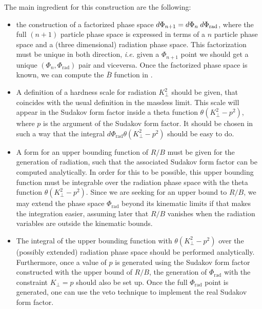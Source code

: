 \documentclass[11pt,a4paper]{article}
\newcommand{\tmop}[1]{\ensuremath{\operatorname{#1}}}
\newcommand{\tmtexttt}[1]{{\ttfamily{#1}}}
\begin{document}
The main ingredient for this construction are the following:
\begin{itemize}
  \item the construction of a factorized phase space $d \Phi_{n + 1} = d
  \Phi_n \hspace{0.25em} d \Phi_{\tmop{rad}}$, where the full $(n + 1)$
  particle phase space is expressed in terms of a $n$ particle phase space and
  a (three dimensional) radiation phase space. This factorization must be
  unique in both direction, {\it i.e.} given a $\Phi_{n + 1}$ point we should get a
  unique $(\Phi_n, \Phi_{\tmop{rad}})$ pair and viceversa. Once the factorized
  phase space is known, we can compute the $\bar{B}$ function in
  \tmtexttt{POWHEG}.
  
  \item A definition of a hardness scale for radiation $K_{\perp}^2$ should be
  given, that coincides with the usual definition in the massless limit. This
  scale will appear in the Sudakov form factor inside a theta function $\theta
  (K_{\perp}^2 - p^2)$, where $p$ is the argument of the Sudakov form factor.
  It should be chosen in such a way that the integral
  $d \Phi_{\tmop{rad}}\theta  (K_{\perp}^2 - p^2)$
  should be easy to do.
  
  \item A form for an upper bounding function of $R / B$ must be given for the
  generation of radiation, such that the associated Sudakov form factor can be
  computed analytically. In order for this to be possible, this upper bounding
  function must be integrable over the radiation phase space with the theta
  function $\theta (K_{\perp}^2 - p^2)$. Since we are seeking for an upper
  bound to $R / B$, we may extend the phase space $\Phi_{\tmop{rad}}$ beyond
  its kinematic limits if that makes the integration easier, assuming later
  that $R / B$ vanishes when the radiation variables are outside 
  the kinematic bounds.
  
  \item The integral of the upper bounding function with $\theta
  (K_{\perp}^2 - p^2)$ over the (possibly extended) radiation phase
  space should be performed analytically. Furthermore, once a value of $p$ is
  generated using the Sudakov form factor constructed with the upper bound of
  $R / B$, the generation of  $\Phi_{\tmop{rad}}$ with the constraint
  $K_\perp=p$ should also be set up. Once the full $\Phi_{\tmop{rad}}$ point is
  generated, one can use the veto technique to implement the real Sudakov form
  factor.
\end{itemize}
\end{document}
